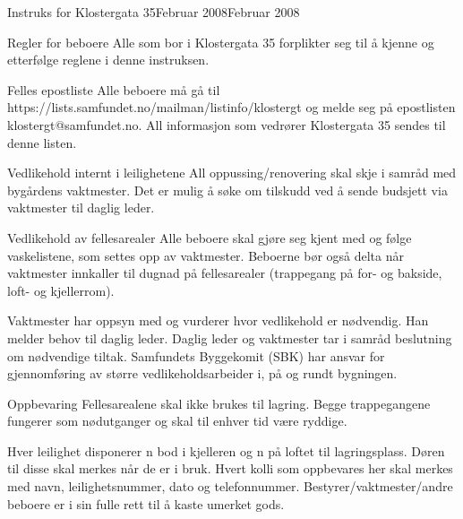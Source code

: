 \documentclass[fsbok.tex]{subfiles}
\begin{document}
\begin{instruks}{Instruks for Klostergata 35}{Februar 2008}{Februar 2008}
    \begin{instruksledd}{Regler for beboere}
        Alle som bor i Klostergata 35 forplikter seg til å kjenne og etterfølge reglene i
        denne instruksen.
    \end{instruksledd}

    \begin{instruksledd}{Felles epostliste}
        Alle beboere må gå til https://lists.samfundet.no/mailman/listinfo/klostergt og
        melde seg på epostlisten
        klostergt@samfundet.no. All informasjon som vedrører Klostergata 35 sendes til
        denne listen.
    \end{instruksledd}

    \begin{instruksledd}{Vedlikehold internt i leilighetene}
        All oppussing/renovering skal skje i samråd med bygårdens vaktmester. Det er mulig
        å søke om tilskudd ved å sende
        budsjett via vaktmester til daglig leder.
    \end{instruksledd}

    \begin{instruksledd}{Vedlikehold av fellesarealer}
        Alle beboere skal gjøre seg kjent med og følge vaskelistene, som settes opp av
        vaktmester. Beboerne bør også delta
        når vaktmester innkaller til dugnad på fellesarealer (trappegang på for- og
        bakside, loft- og kjellerrom).

        Vaktmester har oppsyn med og vurderer hvor vedlikehold er nødvendig. Han melder
        behov til daglig leder. Daglig
        leder og vaktmester tar i samråd beslutning om nødvendige tiltak. Samfundets
        Byggekomit (SBK) har ansvar for
        gjennomføring av større vedlikeholdsarbeider i, på og rundt bygningen.
    \end{instruksledd}

    \begin{instruksledd}{Oppbevaring}
        Fellesarealene skal ikke brukes til lagring. Begge trappegangene fungerer som
        nødutganger og skal til enhver tid være
        ryddige.

        Hver leilighet disponerer n bod i kjelleren og n på loftet til lagringsplass.
        Døren til disse skal merkes når de er i
        bruk. Hvert kolli som oppbevares her skal merkes med navn, leilighetsnummer, dato
        og telefonnummer.
        Bestyrer/vaktmester/andre beboere er i sin fulle rett til å kaste umerket gods.
    \end{instruksledd}


\end{instruks}
\end{document}
